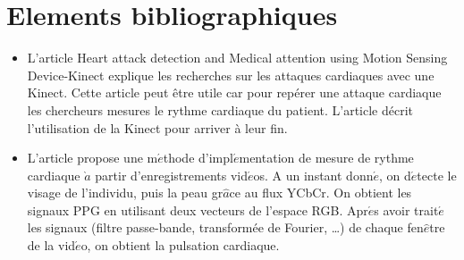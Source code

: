 \documentclass[12 pt]{article}
\begin{document}
\section{Elements bibliographiques}
\begin{itemize}
\item L'article \cite{Patel14} Heart attack detection and Medical attention using Motion Sensing Device-Kinect explique les recherches sur les attaques cardiaques avec une Kinect. Cette article peut être utile car pour repérer une attaque cardiaque les chercheurs mesures le rythme cardiaque du patient. L'article décrit l'utilisation de la Kinect pour arriver à leur fin.
\item L'article \cite{Ufuk} propose une m$\acute{e}$thode d'impl$\acute{e}$mentation de mesure de rythme cardiaque $\grave{a}$ partir d'enregistrements vid$\acute{e}$os.
A un instant donn$\acute{e}$, on d$\acute{e}$tecte le visage de l'individu, puis la peau gr$\hat{a}$ce au flux YCbCr. On obtient les signaux PPG en utilisant deux vecteurs de l'espace RGB. 
Apr$\acute{e}$s avoir trait$\acute{e}$ les signaux (filtre passe-bande, transformée de Fourier, …) de chaque fen$\hat{e}$tre de la vid$\acute{e}$o, on obtient la pulsation cardiaque.

\end{itemize}


\end{document}
